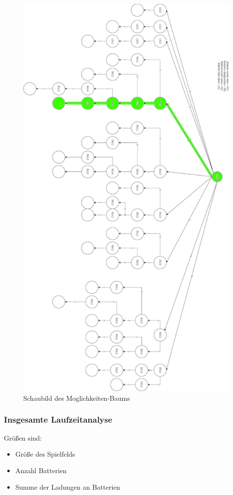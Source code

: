 \documentclass[a4paper,12pt,arial]{scrartcl}
\begin{document}
\begin{figure}[htpb]
    \centering
    \includegraphics[height=0.9\textheight]{rotated_baum_v10.jpg}
    \caption{Schaubild des Moglichkeiten-Baums
    }
    \label{fig:moeglichkeiten_baum}
\end{figure}

\newpage

\subsubsection{Insgesamte Laufzeitanalyse}
Größen sind:
\begin{itemize}
    \item Größe des Spielfelds
    \item Anzahl Batterien
    \item Summe der Ladungen an Batterien
\end{itemize}
\end{document}
